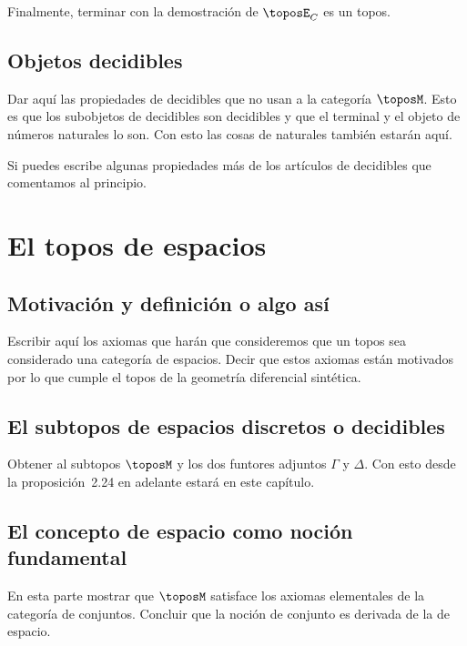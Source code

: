 \documentclass{memoir}
\begin{document}
Finalmente, terminar con la demostración de \(\toposE_C\) es un topos.

\section{Objetos decidibles}
Dar aquí las propiedades de decidibles que no usan a la categoría
\(\toposM\). Esto es que los subobjetos de decidibles son decidibles y que el
terminal y el objeto de números naturales lo son. Con esto las cosas de
naturales también estarán aquí.

Si puedes escribe algunas propiedades más de los artículos de decidibles que
comentamos al principio.

\chapter{El topos de espacios}
\section{Motivación y definición o algo así}
Escribir aquí los axiomas que harán que consideremos que un topos sea
considerado una categoría de espacios. Decir que estos axiomas están motivados
por lo que cumple el topos de la geometría diferencial sintética.

\section{El subtopos de espacios discretos o decidibles}
Obtener al subtopos \(\toposM\) y los dos funtores adjuntos \(\Gamma\) y
\(\Delta\). Con esto desde la proposición~2.24 en adelante estará en este
capítulo.

\section{El concepto de espacio como noción fundamental}
En esta parte mostrar que \(\toposM\) satisface los axiomas elementales de la
categoría de conjuntos. Concluir que la noción de conjunto es derivada de la de
espacio.
\end{document}
